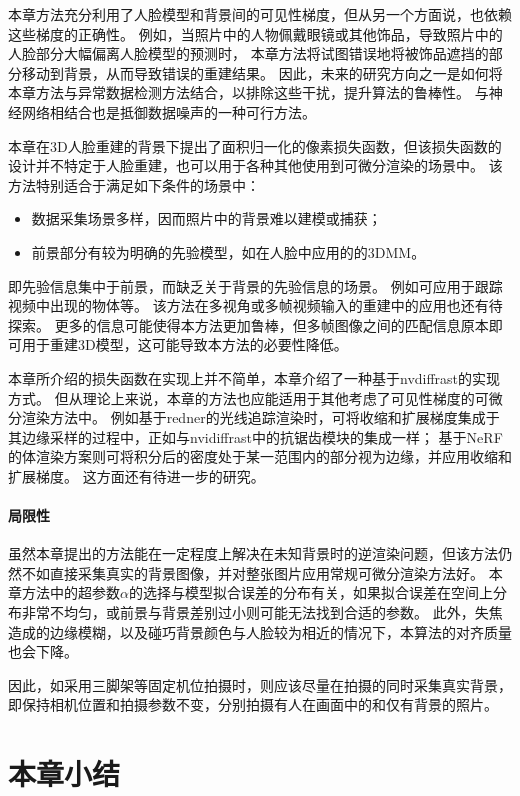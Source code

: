 本章方法充分利用了人脸模型和背景间的可见性梯度，但从另一个方面说，也依赖这些梯度的正确性。
例如，当照片中的人物佩戴眼镜或其他饰品，导致照片中的人脸部分大幅偏离人脸模型的预测时，
本章方法将试图错误地将被饰品遮挡的部分移动到背景，从而导致错误的重建结果。
因此，未来的研究方向之一是如何将本章方法与异常数据检测方法结合，以排除这些干扰，提升算法的鲁棒性。
与神经网络相结合也是抵御数据噪声的一种可行方法。

本章在3D人脸重建的背景下提出了面积归一化的像素损失函数，但该损失函数的设计并不特定于人脸重建，也可以用于各种其他使用到可微分渲染的场景中。
该方法特别适合于满足如下条件的场景中：
\begin{itemize}
    \item 数据采集场景多样，因而照片中的背景难以建模或捕获；
    \item 前景部分有较为明确的先验模型，如在人脸中应用的的3DMM。
\end{itemize}
即先验信息集中于前景，而缺乏关于背景的先验信息的场景。
例如可应用于跟踪视频中出现的物体等。
该方法在多视角或多帧视频输入的重建中的应用也还有待探索。
更多的信息可能使得本方法更加鲁棒，但多帧图像之间的匹配信息原本即可用于重建3D模型，这可能导致本方法的必要性降低。

本章所介绍的损失函数在实现上并不简单，本章介绍了一种基于nvdiffrast的实现方式。
但从理论上来说，本章的方法也应能适用于其他考虑了可见性梯度的可微分渲染方法中。
例如基于redner\citep{redner}的光线追踪渲染时，可将收缩和扩展梯度集成于其边缘采样的过程中，正如与nvidiffrast中的抗锯齿模块的集成一样；
基于NeRF\citep{nerf}的体渲染方案则可将积分后的密度处于某一范围内的部分视为边缘，并应用收缩和扩展梯度。
这方面还有待进一步的研究。

\paragraph{局限性}

虽然本章提出的方法能在一定程度上解决在未知背景时的逆渲染问题，但该方法仍然不如直接采集真实的背景图像，并对整张图片应用常规可微分渲染方法好。
本章方法中的超参数$\alpha$的选择与模型拟合误差的分布有关，如果拟合误差在空间上分布非常不均匀，或前景与背景差别过小则可能无法找到合适的参数。
此外，失焦造成的边缘模糊，以及碰巧背景颜色与人脸较为相近的情况下，本算法的对齐质量也会下降。

因此，如采用三脚架等固定机位拍摄时，则应该尽量在拍摄的同时采集真实背景，即保持相机位置和拍摄参数不变，分别拍摄有人在画面中的和仅有背景的照片。

\section*{本章小结}

